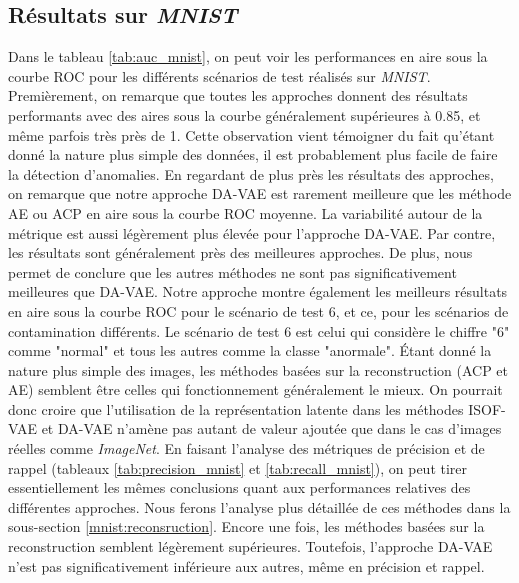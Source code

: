 \subsection{Résultats sur \textit{MNIST}}

Dans le tableau \ref{tab:auc_mnist}, on peut voir les performances en aire sous la courbe ROC pour les différents scénarios de test réalisés sur \textit{MNIST}. Premièrement, on remarque que toutes les approches donnent des résultats performants avec des aires sous la courbe généralement supérieures à 0.85, et même parfois très près de 1. Cette observation vient témoigner du fait qu'étant donné la nature plus simple des données, il est probablement plus facile de faire la détection d'anomalies. En regardant de plus près les résultats des \DIFdelbegin {}\DIFdelend \DIFaddbegin {}\DIFaddend approches, on remarque que notre approche DA-VAE est rarement meilleure que les méthode AE ou ACP en aire sous la courbe ROC moyenne. La variabilité autour de la métrique est aussi légèrement plus élevée pour l'approche DA-VAE. Par contre, les résultats sont généralement près des meilleures approches. De plus, \DIFdelbegin {}\DIFdelend \DIFaddbegin {}\DIFaddend nous permet de conclure que les autres méthodes ne sont pas significativement meilleures que DA-VAE. Notre approche montre également les meilleurs résultats en aire sous la courbe ROC pour le scénario de test 6, et ce, pour les \DIFdelbegin {}\DIFdelend \DIFaddbegin {}\DIFaddend scénarios de contamination différents. Le scénario de test 6 est celui qui considère le chiffre "6" comme "normal" et tous les autres comme la classe "anormale". Étant donné la nature plus simple des images, les méthodes basées sur la reconstruction (ACP et AE) semblent être celles qui fonctionnement généralement le mieux. On pourrait donc croire que l'utilisation de la représentation latente dans les méthodes ISOF-VAE et DA-VAE n'amène pas autant de valeur ajoutée que dans le cas d'images réelles comme \textit{ImageNet}. En faisant l'analyse des métriques de précision et de rappel (tableaux \ref{tab:precision_mnist} et \ref{tab:recall_mnist}), on peut tirer essentiellement les mêmes conclusions quant aux performances relatives des différentes approches. Nous ferons l'analyse plus détaillée de ces méthodes dans la sous-section \ref {mnist:reconsruction}. Encore une fois, les méthodes basées sur la reconstruction semblent légèrement supérieures. Toutefois, l'approche DA-VAE n'est pas significativement inférieure aux autres, même en précision et rappel\DIFdelbegin {}\DIFdelend .

